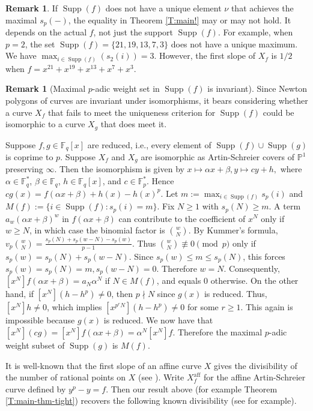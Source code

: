 \documentclass{amsart}
\numberwithin{equation}{section}
\DeclareMathOperator{\Supp}{Supp}
\newcommand{\aff}{\mathrm{aff}}
\theoremstyle{plain}
\theoremstyle{definition}
\newtheorem{remark}[theorem]{Remark}
\begin{document}
\begin{remark}
If $\Supp(f)$ does not have a unique element $\nu$ that achieves
the maximal $s_p(-)$, 
the equality in Theorem \ref{T:main!} may or may not hold. 
It depends on 
the actual $f$, not just the support $\Supp(f)$. 
For example, when $p=2$,
the set $\Supp(f)=\{21,19,13,7,3\}$ does not have a unique maximum.
We have $\max_{i\in \Supp(f)}(s_2(i))=3$.
However, the first slope of $X_f$ is $1/2$
when $f=x^{21} + x^{19} + x^{13} + x^7 + x^3$. 
\end{remark}

\begin{remark}[Maximal \(p\)-adic weight set in \(\Supp(f)\) is invariant]
Since Newton polygons of curves are invariant under isomorphisms, it bears
considering whether a curve \(X_f\) that fails to meet the uniqueness criterion
for \(\Supp(f)\) could be isomorphic to a curve \(X_g\) that does meet it.

Suppose $f,g\in \mathbb{F}_q[x]$ are reduced, i.e., every element of
$\Supp(f)\cup \Supp(g)$ is coprime to $p$. Suppose
$X_f$ and $X_g$ are isomorphic as Artin-Schreier covers of $\mathbb{P}^{1}$
preserving $\infty$.
Then the isomorphism is given by
$
x\longmapsto \alpha x+\beta, y\longmapsto cy+h,
$
where 
$\alpha\in \mathbb{F}_q^*$, $\beta\in \mathbb{F}_q$,
$h\in \mathbb{F}_q[x]$, and $c\in \mathbb{F}_p^*$. 
Hence
$
cg(x)=f(\alpha x+\beta)+h(x)-h(x)^p.
$
Let
$
m:=\max_{i\in \Supp(f)}s_p(i)$ and 
$M(f):=\{i\in \Supp(f):s_p(i)=m\}.
$
Fix
$N\geq 1$ with $s_p(N)\geq m$. 
A term $a_w(\alpha x+\beta)^w$ in $f(\alpha x + \beta)$
can contribute to the coefficient of $x^N$ only if $w\geq N$, in which case
the binomial factor is $\binom{w}{N}$. By Kummer's formula,
$v_p\binom{w}{N}
=
\frac{s_p(N)+s_p(w-N)-s_p(w)}{p-1}.
$
Thus $\binom{w}{N}\not\equiv 0\pmod p$ only if
$
s_p(w)=s_p(N)+s_p(w-N).
$
Since $s_p(w)\leq m\leq s_p(N)$, this forces
$
s_p(w)=s_p(N)=m, s_p(w-N)=0.
$
Therefore $w=N$. Consequently,
$[x^N]f(\alpha x + \beta)=
a_N\alpha^N$ if $N\in M(f)$, and equals $0$ otherwise.
On the other hand, if $[x^N](h-h^p)\ne 0$,
then $p\nmid N$ since $g(x)$ is reduced.
Thus, $[x^N]h \ne 0$,
which implies $[x^{p^r N}](h-h^p)\ne 0$
for some $r \ge 1$.
This again is impossible because $g(x)$ is reduced.
We now have that $[x^N](cg) = [x^N]f(\alpha x + \beta) = \alpha^N[x^N]f$.
Therefore the maximal
$p$-adic weight subset of $\Supp(g)$ is $M(f)$.
\end{remark}


It is well-known that the  
first slope of an affine curve $X$ gives the divisibility of 
the number of rational points on $X$ (see \cite[Proposition 2.2]{Ka71}). 
Write $X_f^{\aff}$ for the affine Artin-Schreier curve defined by $y^p-y=f$.
Then our result above (for example Theorem \ref{T:main-thm-tight}) recovers 
the following known divisibility (see \cite{Wan95} for example).
 
\end{document}
